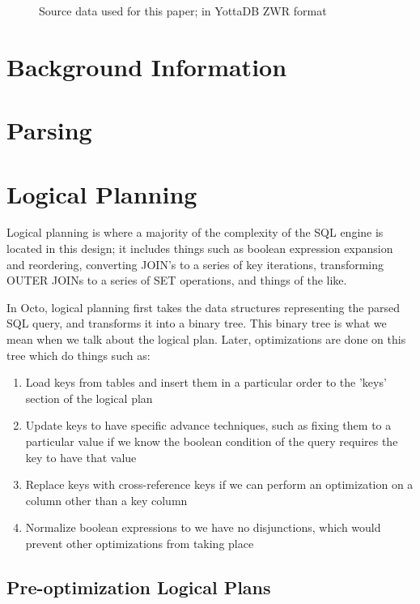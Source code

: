 \documentclass[]{article}
\begin{document}
\begin{figure}
	
	\caption{Source data used for this paper; in YottaDB ZWR format}
	\label{fig:into_names_data}
\end{figure}

\section{Background Information}

\section{Parsing} \label{sec:parsing}


\section{Logical Planning}

Logical planning is where a majority of the complexity of the SQL engine is located in this design; it includes things such as boolean expression expansion and reordering, converting JOIN's to a series of key iterations, transforming OUTER JOINs to a series of SET operations, and things of the like.

In Octo, logical planning first takes the data structures representing the parsed SQL query, and transforms it into a binary tree.
This binary tree is what we mean when we talk about the logical plan.
Later, optimizations are done on this tree which do things such as:

\begin{enumerate}
	\item Load keys from tables and insert them in a particular order to the 'keys' section of the logical plan
	\item Update keys to have specific advance techniques, such as fixing them to a particular value if we know the boolean condition of the query requires the key to have that value
	\item Replace keys with cross-reference keys if we can perform an optimization on a column other than a key column
	\item Normalize boolean expressions to we have no disjunctions, which would prevent other optimizations from taking place
\end{enumerate}

\subsection{Pre-optimization Logical Plans}
\end{document}
